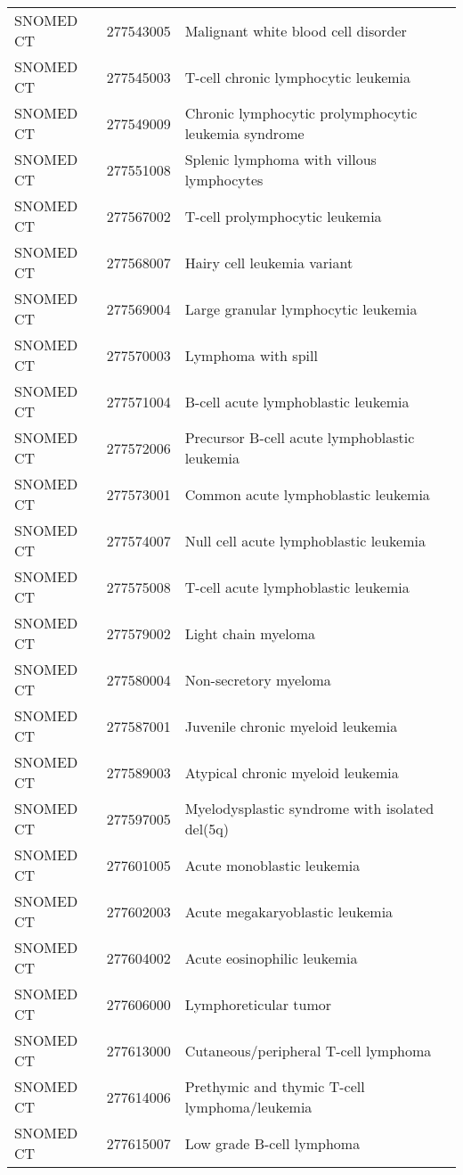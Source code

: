 \begin{table}[ht]
\begin{tabular}{lll}
  SNOMED CT & 277543005 & Malignant white blood cell disorder \\ 
  SNOMED CT & 277545003 & T-cell chronic lymphocytic leukemia \\ 
  SNOMED CT & 277549009 & Chronic lymphocytic prolymphocytic leukemia syndrome \\ 
  SNOMED CT & 277551008 & Splenic lymphoma with villous lymphocytes \\ 
  SNOMED CT & 277567002 & T-cell prolymphocytic leukemia \\ 
  SNOMED CT & 277568007 & Hairy cell leukemia variant \\ 
  SNOMED CT & 277569004 & Large granular lymphocytic leukemia \\ 
  SNOMED CT & 277570003 & Lymphoma with spill \\ 
  SNOMED CT & 277571004 & B-cell acute lymphoblastic leukemia \\ 
  SNOMED CT & 277572006 & Precursor B-cell acute lymphoblastic leukemia \\ 
  SNOMED CT & 277573001 & Common acute lymphoblastic leukemia \\ 
  SNOMED CT & 277574007 & Null cell acute lymphoblastic leukemia \\ 
  SNOMED CT & 277575008 & T-cell acute lymphoblastic leukemia \\ 
  SNOMED CT & 277579002 & Light chain myeloma \\ 
  SNOMED CT & 277580004 & Non-secretory myeloma \\ 
  SNOMED CT & 277587001 & Juvenile chronic myeloid leukemia \\ 
  SNOMED CT & 277589003 & Atypical chronic myeloid leukemia \\ 
  SNOMED CT & 277597005 & Myelodysplastic syndrome with isolated del(5q) \\ 
  SNOMED CT & 277601005 & Acute monoblastic leukemia \\ 
  SNOMED CT & 277602003 & Acute megakaryoblastic leukemia \\ 
  SNOMED CT & 277604002 & Acute eosinophilic leukemia \\ 
  SNOMED CT & 277606000 & Lymphoreticular tumor \\ 
  SNOMED CT & 277613000 & Cutaneous/peripheral T-cell lymphoma \\ 
  SNOMED CT & 277614006 & Prethymic and thymic T-cell lymphoma/leukemia \\ 
  SNOMED CT & 277615007 & Low grade B-cell lymphoma \\ 

\end{tabular}
\end{table}
